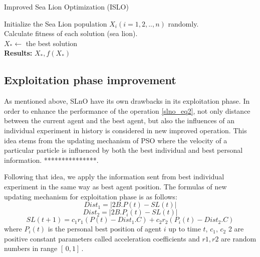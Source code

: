 \documentclass[a4paper,13pt,2p]{report}
\begin{document}
\begin{algorithm}[!t]
\caption{Improved Sea Lion Optimization (ISLO)}
\label{algorithm_islo}
\SetAlgoLined
 Initialize the Sea Lion population $X_i (i=1,2,.., n)$ randomly. \\
 Calculate fitness of each solution (sea lion). \\
 $X_*\gets$ the best solution \\
 \textbf{Results:}  $X_*, f(X_*)$
\end{algorithm}   
\subsection{Exploitation phase improvement}
\label{imprv_exploit}
	As mentioned above, SLnO have its own drawbacks in its exploitation phase. In order to enhance the performance of the operation \ref{slno_eq2}, not only distance between the current agent and the best agent, but also the influences of an individual experiment in history is considered in new improved operation. This idea stems from the updating mechanism of PSO \cite{eberhart1995particle} where the velocity of a particular particle is influenced by both the best individual and best personal information. ***************.
	
	Following that idea, we apply the information sent from best individual experiment in the same way as best agent position. The formulas of new updating mechanism for exploitation phase is as follows:
\begin{equation}\label{islo_eq1}
Dist_1 = |2B.P(t) - SL(t)| 
\end{equation}
\begin{equation}\label{islo_eq2}
Dist_2 = |2B.P_i(t) - SL(t)| 
\end{equation}
\begin{equation}\label{islo_eq3}
SL(t+1) = c_1r_1(P(t) - Dist_1.C) + c_2r_2(P_i(t) - Dist_2.C)
\end{equation}
where $P_i(t)$ is the personal best position of agent $i$ up to time $t$, $c_1$, $c_2$ 2 are positive constant parameters called acceleration coefficients and $r1, r2$ are random numbers in range $[\, 0,1 ] \,$.
\end{document}
